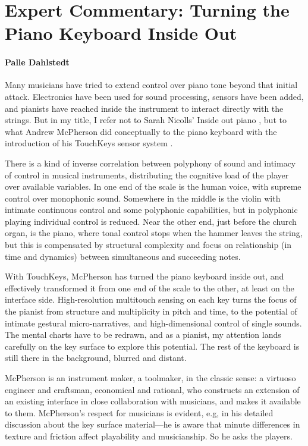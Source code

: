 \section*{Expert Commentary: Turning the Piano Keyboard Inside Out}
\paragraph{Palle Dahlstedt}

Many musicians have tried to extend control over piano tone beyond that initial attack. Electronics have been used for sound processing, sensors have been added, and pianists have reached inside the instrument to interact directly with the strings. But in my title, I refer not to Sarah Nicolls' Inside out piano \cite{Nicolls:2010}, but to what Andrew McPherson did conceptually to the piano keyboard with the introduction of his TouchKeys sensor system \cite{McPherson:2012a}.

There is a kind of inverse correlation between polyphony of sound and intimacy of control in musical instruments, distributing the cognitive load of the player over available variables. In one end of the scale is the human voice, with supreme control over monophonic sound. Somewhere in the middle is the violin with intimate continuous control and some polyphonic capabilities, but in polyphonic playing individual control is reduced. Near the other end, just before the church organ, is the piano, where tonal control stops when the hammer leaves the string, but this is compensated by structural complexity and focus on relationship (in time and dynamics) between simultaneous and succeeding notes.

With TouchKeys, McPherson has turned the piano keyboard inside out, and effectively transformed it from one end of the scale to the other, at least on the interface side. High-resolution multitouch sensing on each key turns the focus of the pianist from structure and multiplicity in pitch and time, to the potential of intimate gestural micro-narratives, and high-dimensional control of single sounds. The mental charts have to be redrawn, and as a pianist, my attention lands carefully on the key surface to explore this potential. The rest of the keyboard is still there in the background, blurred and distant.

McPherson is an instrument maker, a toolmaker, in the classic sense: a virtuoso engineer and craftsman, economical and rational, who constructs an extension of an existing interface in close collaboration with musicians, and makes it available to them. McPherson's respect for musicians is evident, e.g, in his detailed discussion about the key surface material---he is aware that minute differences in texture and friction affect playability and musicianship. So he asks the players.

